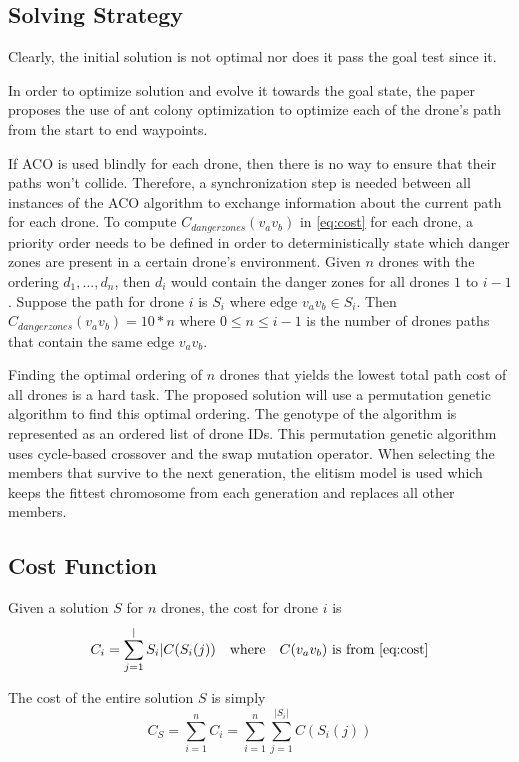 \documentclass[conference]{IEEEtran}
\begin{document}
\subsection{Solving Strategy}
Clearly, the initial solution is not optimal nor does it pass the goal test since it.

In order to optimize solution and evolve it towards the goal state, the paper proposes the use of ant colony optimization to optimize each of the drone's path from the start to end waypoints.

If ACO is used blindly for each drone, then there is no way to ensure that their paths won't collide. Therefore, a synchronization step is needed between all instances of the ACO algorithm to exchange information about the current path for each drone. To compute $C_{danger zones}(v_av_b)$ in \ref{eq:cost} for each drone, a priority order needs to be defined in order to deterministically state which danger zones are present in a certain drone's environment. Given $n$ drones with the ordering $d_1, ..., d_n$, then $d_i$ would contain the danger zones for all drones $1$ to $i-1$. Suppose the path for drone $i$ is $S_i$ where edge $v_av_b \in S_i$. Then $C_{danger zones}(v_av_b) = 10*n$ where $0 \leq n \leq i-1$ is the number of drones paths that contain the same edge $v_av_b$.

Finding the optimal ordering of $n$ drones that yields the lowest total path cost of all drones is a hard task. The proposed solution will use a permutation genetic algorithm to find this optimal ordering. The genotype of the algorithm is represented as an ordered list of drone IDs. This permutation genetic algorithm uses cycle-based crossover and the swap mutation operator. When selecting the members that survive to the next generation, the elitism model is used which keeps the fittest chromosome from each generation and replaces all other members.

\subsection{Cost Function}
Given a solution $S$ for $n$ drones, the cost for drone $i$ is 
\begin{equation} \label{eq:costdrone}
C_i = \sum_{j=1}^|S_i| C(S_i(j)) \quad \text{where} \quad C(v_av_b) \text{ is from \ref{eq:cost}}
\end{equation}

The cost of the entire solution $S$ is simply
\begin{equation} \label{eq:costsolution}
C_S = \sum_{i=1}^n C_i = \sum_{i=1}^n \sum_{j=1}^|S_i| C(S_i(j))
\end{equation}
\end{document}

